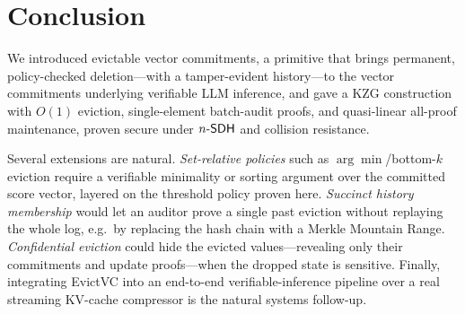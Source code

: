 \section{Conclusion}\label{sec:conc}

We introduced evictable vector commitments, a primitive that brings permanent,
policy-checked deletion---with a tamper-evident history---to the vector
commitments underlying verifiable LLM inference, and gave a KZG construction with
$O(1)$ eviction, single-element batch-audit proofs, and quasi-linear all-proof
maintenance, proven secure under $n\text{-}\mathsf{SDH}$ and collision resistance.

Several extensions are natural. \emph{Set-relative policies} such as
$\arg\min$/bottom-$k$ eviction require a verifiable minimality or sorting argument
over the committed score vector, layered on the threshold policy proven here.
\emph{Succinct history membership} would let an auditor prove a single past
eviction without replaying the whole log, e.g.\ by replacing the hash chain with
a Merkle Mountain Range. \emph{Confidential eviction} could hide the evicted
values---revealing only their commitments and update proofs---when the dropped
state is sensitive. Finally, integrating EvictVC into an end-to-end
verifiable-inference pipeline over a real streaming KV-cache compressor is the
natural systems follow-up.

